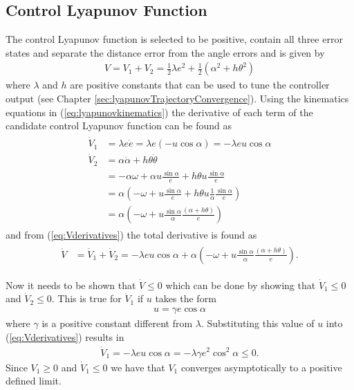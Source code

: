 \subsection{Control Lyapunov Function}
\label{sec:controllyapunov}
The control Lyapunov function is selected to be positive, contain all three error states and separate the distance error from the angle errors and is given by
\begin{align}
\label{eq:lyapunovfunction}
V = V_1 + V_2 = \frac{1}{2}\lambda e^2 + \frac{1}{2}\left(\alpha^2+h\theta^2\right)
\end{align}
where $\lambda$ and $h$ are positive constants that can be used to tune the controller output (see Chapter \ref{sec:lyapunovTrajectoryConvergence}). Using the kinematics equations in (\ref{eq:lyapunovkinematics}) the derivative of each term of the candidate control Lyapunov function can be found as
\begin{align}
\label{eq:Vderivatives}
\begin{split}
\dot{V}_1 &= \lambda e\dot{e} = \lambda e (-u\cos\alpha) = -\lambda eu\cos\alpha \\
\dot{V}_2 &= \alpha\dot{\alpha}+h\theta\dot{\theta} \\
&= -\alpha\omega + \alpha u\frac{\sin\alpha}{e} + h\theta u\frac{\sin\alpha}{e} \\
&= \alpha\left(-\omega + u\frac{\sin\alpha}{e} + h\theta u\frac{1}{\alpha}\frac{\sin\alpha}{e}\right) \\
&= \alpha\left(-\omega + u\frac{\sin\alpha}{\alpha}\frac{(\alpha+h\theta)}{e}\right)
\end{split}
\end{align}
and from (\ref{eq:Vderivatives}) the total derivative is found as
\begin{align}
\label{eq:lyapunovfunctionderivative}
\begin{split}
\dot{V} &= \dot{V}_1 + \dot{V}_2 = -\lambda e u\cos\alpha + \alpha\left(-\omega+u\frac{\sin\alpha}{\alpha}\frac{(\alpha+h\theta)}{e}\right).
\end{split}
\end{align}

Now it needs to be shown that $\dot{V}\leq0$ which can be done by showing that $\dot{V}_1\leq0$ and $\dot{V}_2\leq0$. This is true for $\dot{V}_1$ if $u$ takes the form
\begin{align}
\label{eq:lyapunovu}
u = \gamma e\cos\alpha
\end{align}
where $\gamma$ is a positive constant different from $\lambda$. Substituting this value of $u$ into (\ref{eq:Vderivatives}) results in
\begin{align}
\label{eq:V1dotfinal}
\dot{V}_1 = -\lambda eu\cos\alpha = -\lambda\gamma e^2\cos^2\alpha \leq 0.
\end{align}
Since $V_1\geq0$ and $\dot{V}_1\leq0$ we have that $V_1$ converges asymptotically to a positive defined limit.

